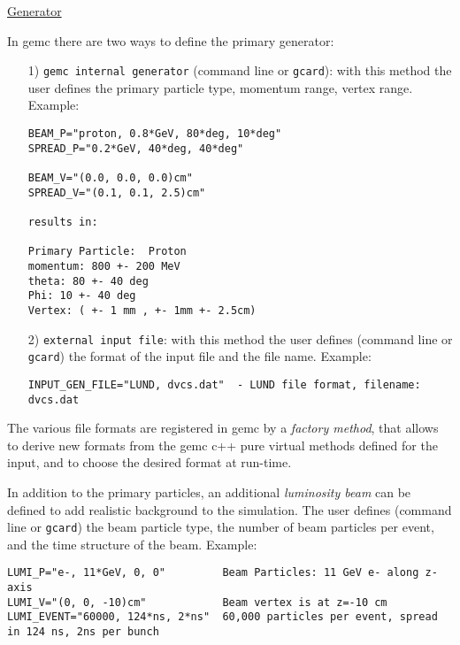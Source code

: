 \underline{Generator}
\vskip 0.5cm

\noindent
In gemc there are two ways to define the primary generator:
\begin{itemize}
\item[1)] {\tt gemc internal generator} (command line or {\tt gcard}): with this method the user
defines the primary particle type, momentum range, vertex range. Example:

\footnotesize
\begin{verbatim}
BEAM_P="proton, 0.8*GeV, 80*deg, 10*deg"
SPREAD_P="0.2*GeV, 40*deg, 40*deg"

BEAM_V="(0.0, 0.0, 0.0)cm"
SPREAD_V="(0.1, 0.1, 2.5)cm"

results in:

Primary Particle:  Proton
momentum: 800 +- 200 MeV
theta: 80 +- 40 deg
Phi: 10 +- 40 deg
Vertex: ( +- 1 mm , +- 1mm +- 2.5cm) 

\end{verbatim}
\normalsize

\item[2)] {\tt external input file}: with this method the user defines (command line or {\tt gcard}) the format
of the input file and the file name. Example:
\footnotesize
\begin{verbatim}
INPUT_GEN_FILE="LUND, dvcs.dat"  - LUND file format, filename:  dvcs.dat
\end{verbatim}
\normalsize 
\end{itemize}

The various file formats are registered in gemc by a {\it factory method}, that allows to derive
new formats from the gemc c++ pure virtual methods defined for the input, and to choose
the desired format at run-time.

\vskip 0.5cm
In addition to the primary particles, an additional {\it luminosity beam} can be defined to add realistic background
to the simulation. The user defines  (command line or {\tt gcard}) the beam particle type,
the number of beam particles per event, and the time structure of the beam. Example:

\footnotesize
\begin{verbatim}
LUMI_P="e-, 11*GeV, 0, 0"         Beam Particles: 11 GeV e- along z-axis
LUMI_V="(0, 0, -10)cm"            Beam vertex is at z=-10 cm
LUMI_EVENT="60000, 124*ns, 2*ns"  60,000 particles per event, spread in 124 ns, 2ns per bunch

\end{verbatim}
\normalsize

